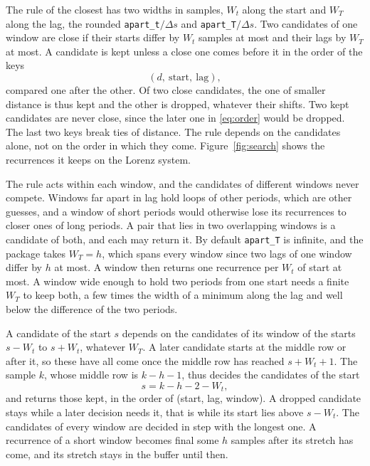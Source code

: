 \documentclass[11pt]{article}
\newcommand{\code}[1]{\texttt{#1}}
\begin{document}
The rule of the closest has two widths in samples, $W_t$ along the start and $W_T$ along the lag, the rounded \code{apart\_t}$/\Delta s$ and \code{apart\_T}$/\Delta s$. Two candidates of one window are close if their starts differ by $W_t$ samples at most and their lags by $W_T$ at most. A candidate is kept unless a close one comes before it in the order of the keys
\begin{equation}
(d,\ \text{start},\ \text{lag}),
\label{eq:order}
\end{equation}
compared one after the other. Of two close candidates, the one of smaller distance is thus kept and the other is dropped, whatever their shifts. Two kept candidates are never close, since the later one in \eqref{eq:order} would be dropped. The last two keys break ties of distance. The rule depends on the candidates alone, not on the order in which they come. Figure~\ref{fig:search} shows the recurrences it keeps on the Lorenz system.

The rule acts within each window, and the candidates of different windows never compete. Windows far apart in lag hold loops of other periods, which are other guesses, and a window of short periods would otherwise lose its recurrences to closer ones of long periods. A pair that lies in two overlapping windows is a candidate of both, and each may return it. By default \code{apart\_T} is infinite, and the package takes $W_T = h$, which spans every window since two lags of one window differ by $h$ at most. A window then returns one recurrence per $W_t$ of start at most. A window wide enough to hold two periods from one start needs a finite $W_T$ to keep both, a few times the width of a minimum along the lag and well below the difference of the two periods.

A candidate of the start $s$ depends on the candidates of its window of the starts $s - W_t$ to $s + W_t$, whatever $W_T$. A later candidate starts at the middle row or after it, so these have all come once the middle row has reached $s + W_t + 1$. The sample $k$, whose middle row is $k - h - 1$, thus decides the candidates of the start
\begin{equation}
s = k - h - 2 - W_t,
\label{eq:decided}
\end{equation}
and returns those kept, in the order of (start, lag, window). A dropped candidate stays while a later decision needs it, that is while its start lies above $s - W_t$. The candidates of every window are decided in step with the longest one. A recurrence of a short window becomes final some $h$ samples after its stretch has come, and its stretch stays in the buffer until then.
\end{document}

